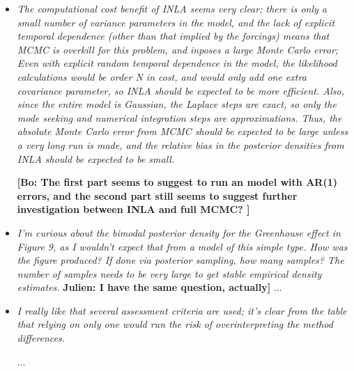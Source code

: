 \documentclass[11pt]{article}
\newcommand{\bl}[1]{\color{red}\textbf{[Bo: #1]}\normalcolor}
\newcommand{\jeg}[1]{\color{blue}\textbf{Julien: #1]}\normalcolor}
\begin{document}
\begin{itemize}
\bl{I think we used the same model. The two plots have the same calibration period?}

\item \textit{The computational cost benefit of INLA seems very clear; there is
  only a small number of variance parameters in the model, and the
  lack of explicit temporal dependence (other than that implied by the
  forcings) means that MCMC is overkill for this problem, and inposes
  a large Monte Carlo error; Even with explicit random temporal
  dependence in the model, the likelihood calculations would be order
  N in cost, and would only add one extra covariance parameter, so
  INLA should be expected to be more efficient.  Also, since the
  entire model is Gaussian, the Laplace steps are exact, so only the
  mode seeking and numerical integration steps are approximations.
  Thus, the absolute Monte Carlo error from MCMC should be expected to
  be large unless a very long run is made, and the relative bias in
  the posterior densities from INLA should be expected to be small.}

\bl{The first part seems to suggest to run an model with AR(1) errors, and the second part still seems to suggest further investigation between INLA and full MCMC? }

\item \textit{I'm curious about the bimodal posterior density for the Greenhouse
  effect in Figure 9, as I wouldn't expect that from a model of this
  simple type.  How was the figure produced? If done via posterior
  sampling, how many samples? The number of samples needs to be very
  large to get stable empirical density estimates.}
\jeg{I have the same question, actually}
...

\item \textit{I really like that several assessment criteria are used; it's clear
  from the table that relying on only one would run the risk of
  overinterpreting the method differences.}

...

\end{itemize}
\end{document}

